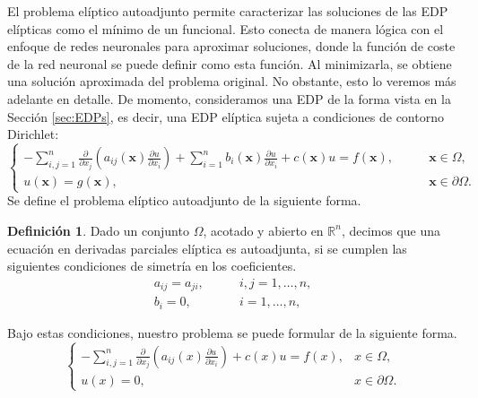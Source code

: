 \documentclass[a4paper,11pt,spanish, twoside, leqno]{tfg-uam}
\theoremstyle{definition}
\newtheorem{defin}[teor]{Definici\'on}
\begin{document}
El problema elíptico autoadjunto  permite caracterizar las soluciones de las EDP elípticas como el mínimo de un funcional. Esto conecta de manera lógica con el enfoque de redes neuronales para aproximar soluciones, donde la función de coste de la red neuronal se puede definir como esta función. Al minimizarla, se obtiene una solución aproximada del problema original. No obstante, esto lo veremos más adelante en detalle. De momento, consideramos una EDP de la forma vista en la Sección \ref{sec:EDPs}, es decir, una EDP elíptica sujeta a condiciones de contorno Dirichlet:
\begin{equation} 
    \begin{cases} -\sum_{i,j=1}^{n} \frac{\partial}{\partial x_j}\left( a_{ij}(\mathbf{x})\frac{\partial u}{\partial x_i}\right) + \sum_{i=1}^{n} b_i(\mathbf{x})\frac{\partial u}{\partial x_i} + c(\mathbf{x})u = f(\mathbf{x}), &\qquad \mathbf{x}\in\Omega,\\ u(\mathbf{x}) = g(\mathbf{x}), &\qquad \mathbf{x}\in\partial\Omega. 
    \end{cases} 
\end{equation} 
Se define el problema elíptico autoadjunto de la siguiente forma.
\begin{mdframed}
\begin{defin}
    Dado un conjunto $\Omega$, acotado y abierto en $\mathbb{R}^n$, decimos que una ecuación en derivadas parciales elíptica es autoadjunta, si se cumplen las siguientes condiciones de simetría en los coeficientes.
    \begin{equation}\label{eq:simetria_a}
        \begin{split}
            a_{ij} = a_{ji},\qquad &i,j = 1,\dots,n,\\
            b_i = 0, \qquad &i = 1,\dots,n,
        \end{split}
    \end{equation}
\end{defin}
\end{mdframed}
Bajo estas condiciones, nuestro problema se puede formular de la siguiente forma.
\begin{equation} \label{eq:ProblemaAutoadjuntoFuerte}
    \begin{cases}
        -\sum_{i,j=1}^{n} \frac{\partial}{\partial x_j}\left( a_{ij}(x)\frac{\partial u}{\partial x_i}\right) + c(x)u = f(x), & x\in\Omega,\\
        u(x) = 0, & x\in\partial\Omega.
    \end{cases}
\end{equation}
\end{document}
